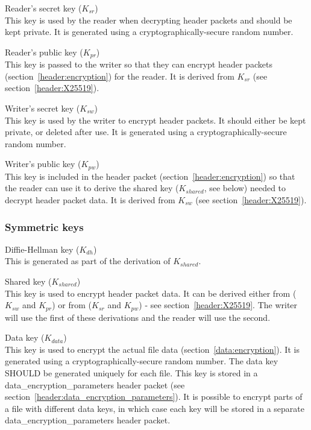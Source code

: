 \documentclass[10pt]{article}
\begin{document}
\begin{description}

\item{Reader's secret key ($K_{sr}$)}~\\
This key is used by the reader when decrypting header packets and should be kept private.
It is generated using a cryptographically-secure random number.

\item{Reader's public key ($K_{pr}$)}~\\
This key is passed to the writer so that they can encrypt header packets (section~\ref{header:encryption}) for the
reader.
It is derived from $K_{sr}$ (see section~\ref{header:X25519}).

\item{Writer's secret key ($K_{sw}$)}~\\
This key is used by the writer to encrypt header packets.
It should either be kept private, or deleted after use.
It is generated using a cryptographically-secure random number.

\item{Writer's public key ($K_{pw}$)}~\\
This key is included in the header packet (section~\ref{header:encryption}) so that the reader can use it to
derive the shared key ($K_{shared}$, see below) needed to decrypt header packet data.
It is derived from $K_{sw}$ (see section~\ref{header:X25519}).

\end{description}

\subsubsection{Symmetric keys}

\begin{description}

\item{Diffie-Hellman key ($K_{dh}$)}~\\
This is generated as part of the derivation of $K_{shared}$.

\item{Shared key ($K_{shared}$)}~\\
This key is used to encrypt header packet data.
It can be derived either from ($K_{sw}$ and $K_{pr}$) or from ($K_{sr}$ and $K_{pw}$) - see section~\ref{header:X25519}.
The writer will use the first of these derivations and the reader will use the second.

\item{Data key ($K_{data}$)}~\\
This key is used to encrypt the actual file data (section~\ref{data:encryption}).
It is generated using a cryptographically-secure random number.
The data key SHOULD be generated uniquely for each file.
This key is stored in a data\_encryption\_parameters header packet (see section~\ref{header:data_encryption_parameters}).
It is possible to encrypt parts of a file with different data keys,
in which case each key will be stored in a separate data\_encryption\_parameters header packet.

\end{description}
\end{document}
